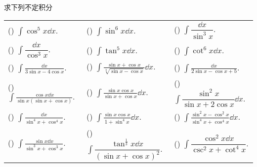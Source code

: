 \begin{example}
    求下列不定积分
    \setcounter{magicrownumbers}{0}
    \begin{table}[H]
        \centering
        \begin{tabular}{l | l | l}
            (\rownumber{}) $\displaystyle\int\cos^5x\dd x.$                              & (\rownumber{}) $\displaystyle\int\sin^6x\dd x.$                                        & (\rownumber{}) $\displaystyle\int\dfrac{\dd x}{\sin^3x}.$                       \\
            (\rownumber{}) $\displaystyle\int\dfrac{\dd x}{\cos^3x}.$                    & (\rownumber{}) $\displaystyle\int\tan^5x\dd x.$                                        & (\rownumber{}) $\displaystyle\int\cot^6x\dd x.$                                 \\
            (\rownumber{}) $\displaystyle\int\frac{\dd x}{3\sin x-4\cos x}.$             & (\rownumber{}) $\displaystyle\int\frac{\sin x+\cos x}{\sqrt[3]{\sin x-\cos x}}\dd x.$  & (\rownumber{}) $\displaystyle\int\frac{\dd x}{2\sin x-\cos x+5}.$               \\
            (\rownumber{}) $\displaystyle\int\frac{\cos x\dd x}{\sin x(\sin x+\cos x)}.$ & (\rownumber{}) $\displaystyle\int\frac{\sin x\cos x}{\sin x+\cos x}\dd x.$             & (\rownumber{}) $\displaystyle\int\dfrac{\sin^2x}{\sin x+2\cos x}\dd x.$         \\
            (\rownumber{}) $\displaystyle\int\frac{\dd x}{\sin^4x+\cos^4x}.$             & (\rownumber{}) $\displaystyle\int\frac{\sin x\cos x}{1+\sin^4x}\dd x.$                 & (\rownumber{}) $\displaystyle\int\frac{\sin^2x-\cos^2x}{\sin^4x+\cos^4x}\dd x.$ \\
            (\rownumber{}) $\displaystyle\int\frac{\sin x\dd x}{\sin^3x+\cos^3x}.$       & (\rownumber{}) $\displaystyle\int\dfrac{\tan^{\frac{1}{3}}x\dd x}{(\sin x+\cos x)^2}.$ & (\rownumber{}) $\displaystyle\int\dfrac{\cos^2x\dd x}{\csc^2x+\cot^4x}.$
        \end{tabular}
    \end{table}
\end{example}
